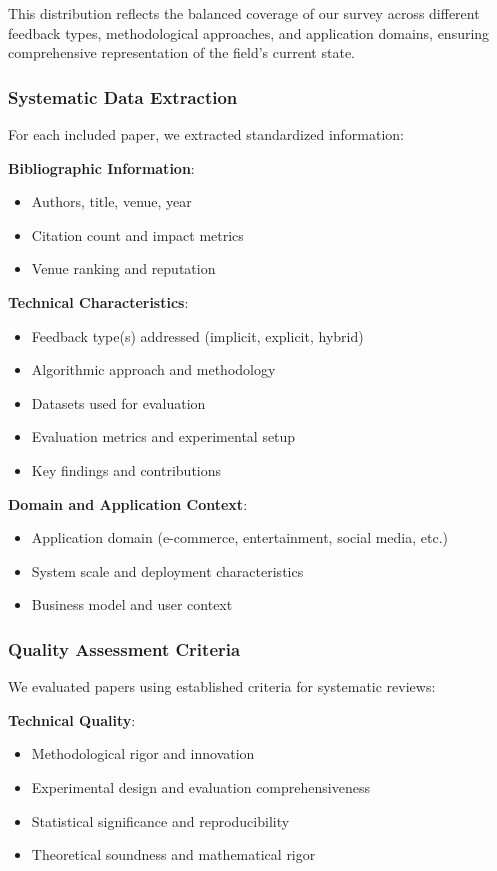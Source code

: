 This distribution reflects the balanced coverage of our survey across different feedback types, methodological approaches, and application domains, ensuring comprehensive representation of the field's current state.

\subsubsection{Systematic Data Extraction}
For each included paper, we extracted standardized information:

\textbf{Bibliographic Information}:
\begin{itemize}
    \item Authors, title, venue, year
    \item Citation count and impact metrics
    \item Venue ranking and reputation
\end{itemize}

\textbf{Technical Characteristics}:
\begin{itemize}
    \item Feedback type(s) addressed (implicit, explicit, hybrid)
    \item Algorithmic approach and methodology
    \item Datasets used for evaluation
    \item Evaluation metrics and experimental setup
    \item Key findings and contributions
\end{itemize}

\textbf{Domain and Application Context}:
\begin{itemize}
    \item Application domain (e-commerce, entertainment, social media, etc.)
    \item System scale and deployment characteristics
    \item Business model and user context
\end{itemize}

\subsubsection{Quality Assessment Criteria}
We evaluated papers using established criteria for systematic reviews:

\textbf{Technical Quality}:
\begin{itemize}
    \item Methodological rigor and innovation
    \item Experimental design and evaluation comprehensiveness
    \item Statistical significance and reproducibility
    \item Theoretical soundness and mathematical rigor
\end{itemize}

